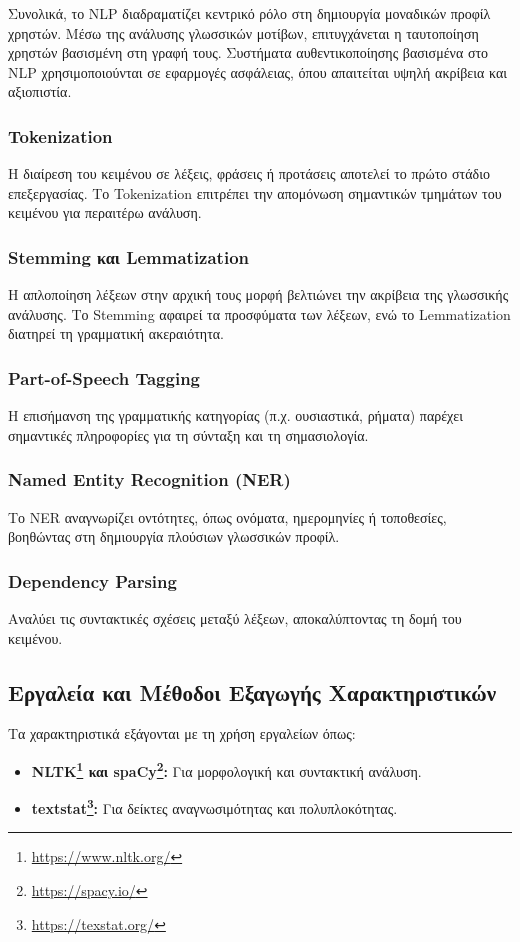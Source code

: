 Συνολικά, το NLP διαδραματίζει κεντρικό ρόλο στη δημιουργία μοναδικών προφίλ χρηστών. Μέσω της ανάλυσης γλωσσικών μοτίβων, επιτυγχάνεται η ταυτοποίηση χρηστών βασισμένη στη γραφή τους. Συστήματα αυθεντικοποίησης βασισμένα στο NLP χρησιμοποιούνται σε εφαρμογές ασφάλειας, όπου απαιτείται υψηλή ακρίβεια και αξιοπιστία.

\subsubsection{Tokenization}
Η διαίρεση του κειμένου σε λέξεις, φράσεις ή προτάσεις αποτελεί το πρώτο στάδιο επεξεργασίας. Το Tokenization επιτρέπει την απομόνωση σημαντικών τμημάτων του κειμένου για περαιτέρω ανάλυση.

\subsubsection{Stemming και Lemmatization}
Η απλοποίηση λέξεων στην αρχική τους μορφή βελτιώνει την ακρίβεια της γλωσσικής ανάλυσης. Το Stemming αφαιρεί τα προσφύματα των λέξεων, ενώ το Lemmatization διατηρεί τη γραμματική ακεραιότητα.

\subsubsection{Part-of-Speech Tagging}
Η επισήμανση της γραμματικής κατηγορίας (π.χ. ουσιαστικά, ρήματα) παρέχει σημαντικές πληροφορίες για τη σύνταξη και τη σημασιολογία.

\subsubsection{Named Entity Recognition (NER)}
Το NER αναγνωρίζει οντότητες, όπως ονόματα, ημερομηνίες ή τοποθεσίες, βοηθώντας στη δημιουργία πλούσιων γλωσσικών προφίλ.

\subsubsection{Dependency Parsing}
Αναλύει τις συντακτικές σχέσεις μεταξύ λέξεων, αποκαλύπτοντας τη δομή του κειμένου.

\subsection{Εργαλεία και Μέθοδοι Εξαγωγής Χαρακτηριστικών}
Τα χαρακτηριστικά εξάγονται με τη χρήση εργαλείων όπως:
\begin{itemize}
    \item \textbf{NLTK\footnote{\url{https://www.nltk.org/}} και spaCy\footnote{\url{https://spacy.io/}}:} Για μορφολογική και συντακτική ανάλυση.
    \item \textbf{textstat\footnote{\url{https://texstat.org/}}:} Για δείκτες αναγνωσιμότητας και πολυπλοκότητας.
\end{itemize}

